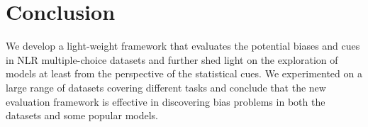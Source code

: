 \section{Conclusion}
We develop a light-weight 
framework that evaluates the potential biases and cues in NLR multiple-choice 
datasets and further shed light on
the exploration of models at least from the perspective of the statistical cues. 
We experimented on a large range of datasets covering different tasks and 
conclude that the new evaluation framework is effective in discovering
bias problems in both the datasets and some popular models.
